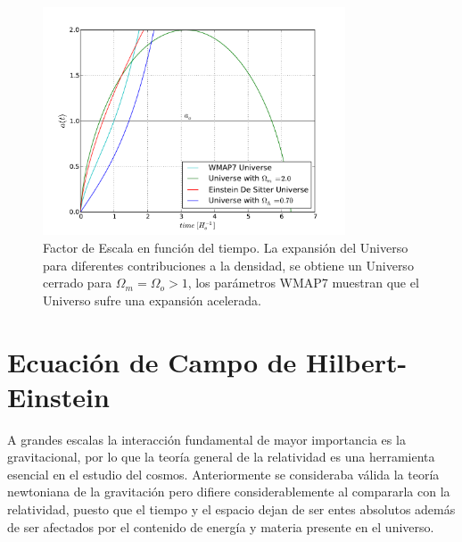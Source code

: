 \begin{figure}[htbp]
       \centering
               \includegraphics[width=0.8\textwidth]{Images/chapter2/factordeescala.pdf}
       \caption{ \small Factor de Escala en función del tiempo. La expansión del Universo para 
       diferentes contribuciones a la densidad, se obtiene un Universo cerrado para $\Omega_m = \Omega_o>1$,
       los parámetros WMAP7 muestran que el Universo sufre una expansión acelerada. 
       }
       \label{factor}
 \end{figure}


\section{Ecuaci\'on de Campo de Hilbert-Einstein}

A grandes escalas la interacción fundamental de mayor importancia es 
la gravitacional, por lo que la teoría general de la relatividad 
es una herramienta esencial en el estudio del cosmos. 
Anteriormente se consideraba válida la teoría newtoniana de la gravitación pero 
difiere considerablemente al compararla con la relatividad, 
puesto que el tiempo y el espacio dejan de ser entes absolutos 
además de ser afectados por 
el contenido de energ\'ia y materia presente en el universo. 

